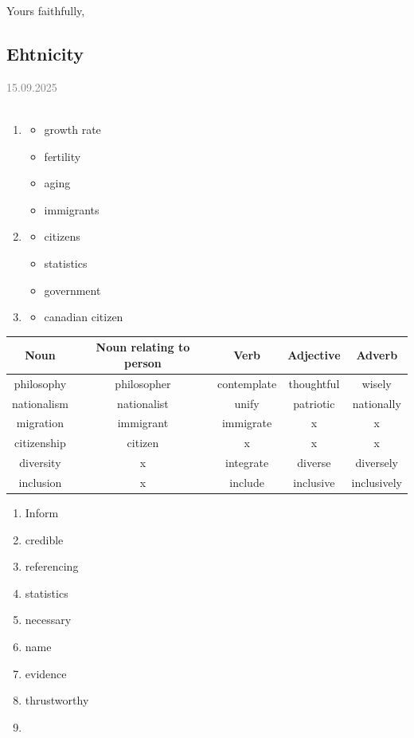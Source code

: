 \documentclass[11pt,a4paper,oneside]{article}
\newcommand{\lessondate}[1]{
	\noindent\hfill\textcolor{gray}{\textsc{#1}} \\
	\vspace{0.5cm}
}
\begin{document}
	Yours faithfully,
	\newpage
	
	\subsection{Ehtnicity}
	\lessondate{15.09.2025}\\
	\begin{enumerate}
		\item 
		\begin{itemize}
			\item growth rate 
			\item fertility 
			\item aging
			\item immigrants
		\end{itemize}
		\item 
		\begin{itemize}
			\item citizens 
			\item statistics 
			\item government
		\end{itemize}
		\item 
		\begin{itemize}
			\item canadian citizen  
		\end{itemize}
	\end{enumerate}

	\begin{center}
		\begin{tabular}{|c|c|c|c|c|}
			\hline
			Noun & Noun relating to person & Verb & Adjective & Adverb \\ \hline
			philosophy & philosopher & contemplate & thoughtful & wisely \\ \hline
			nationalism & nationalist & unify & patriotic & nationally \\ \hline
			migration & immigrant & immigrate & x & x\\ \hline
			citizenship & citizen & x& x &x \\ \hline
			diversity & x & integrate & diverse & diversely \\ \hline
			inclusion & x & include & inclusive & inclusively \\ \hline
		\end{tabular}
	\end{center}
	
	\begin{enumerate}
		\item Inform 
		\item credible
		\item referencing 
		\item statistics
		\item necessary
		\item name 
		\item evidence 
		\item thrustworthy 
		\item 
	\end{enumerate}
	\newpage
	
\end{document}
